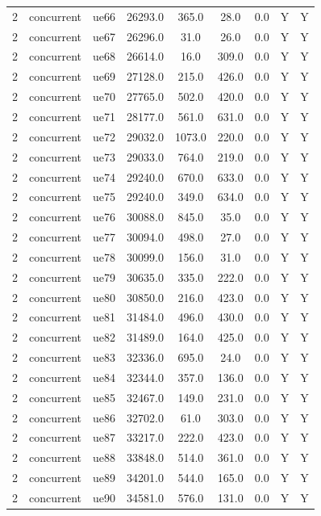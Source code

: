\begin{table}[ht]
\begin{tabular}{|c|c|c|c|c|c|c|c|c|}
2 & concurrent & ue66 & 26293.0 & 365.0 & 28.0 & 0.0 & Y & Y \\
2 & concurrent & ue67 & 26296.0 & 31.0 & 26.0 & 0.0 & Y & Y \\
2 & concurrent & ue68 & 26614.0 & 16.0 & 309.0 & 0.0 & Y & Y \\
2 & concurrent & ue69 & 27128.0 & 215.0 & 426.0 & 0.0 & Y & Y \\
2 & concurrent & ue70 & 27765.0 & 502.0 & 420.0 & 0.0 & Y & Y \\
2 & concurrent & ue71 & 28177.0 & 561.0 & 631.0 & 0.0 & Y & Y \\
2 & concurrent & ue72 & 29032.0 & 1073.0 & 220.0 & 0.0 & Y & Y \\
2 & concurrent & ue73 & 29033.0 & 764.0 & 219.0 & 0.0 & Y & Y \\
2 & concurrent & ue74 & 29240.0 & 670.0 & 633.0 & 0.0 & Y & Y \\
2 & concurrent & ue75 & 29240.0 & 349.0 & 634.0 & 0.0 & Y & Y \\
2 & concurrent & ue76 & 30088.0 & 845.0 & 35.0 & 0.0 & Y & Y \\
2 & concurrent & ue77 & 30094.0 & 498.0 & 27.0 & 0.0 & Y & Y \\
2 & concurrent & ue78 & 30099.0 & 156.0 & 31.0 & 0.0 & Y & Y \\
2 & concurrent & ue79 & 30635.0 & 335.0 & 222.0 & 0.0 & Y & Y \\
2 & concurrent & ue80 & 30850.0 & 216.0 & 423.0 & 0.0 & Y & Y \\
2 & concurrent & ue81 & 31484.0 & 496.0 & 430.0 & 0.0 & Y & Y \\
2 & concurrent & ue82 & 31489.0 & 164.0 & 425.0 & 0.0 & Y & Y \\
2 & concurrent & ue83 & 32336.0 & 695.0 & 24.0 & 0.0 & Y & Y \\
2 & concurrent & ue84 & 32344.0 & 357.0 & 136.0 & 0.0 & Y & Y \\
2 & concurrent & ue85 & 32467.0 & 149.0 & 231.0 & 0.0 & Y & Y \\
2 & concurrent & ue86 & 32702.0 & 61.0 & 303.0 & 0.0 & Y & Y \\
2 & concurrent & ue87 & 33217.0 & 222.0 & 423.0 & 0.0 & Y & Y \\
2 & concurrent & ue88 & 33848.0 & 514.0 & 361.0 & 0.0 & Y & Y \\
2 & concurrent & ue89 & 34201.0 & 544.0 & 165.0 & 0.0 & Y & Y \\
2 & concurrent & ue90 & 34581.0 & 576.0 & 131.0 & 0.0 & Y & Y \\

\end{tabular}
\end{table}
